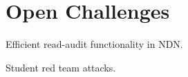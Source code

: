 \section{Open Challenges}

Efficient read-audit functionality in NDN. 

Student red team attacks. 

